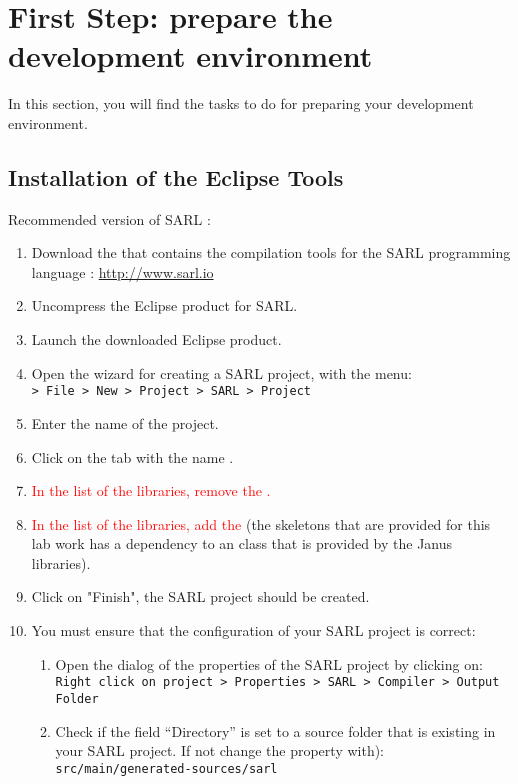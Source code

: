 \section{First Step: prepare the development environment}

In this section, you will find the tasks to do for preparing your development environment.

\subsection{Installation of the Eclipse Tools}

\begin{emphbox}
Recommended version of SARL : \sarlversion
\end{emphbox}

\begin{enumerate}
\item Download the  that contains the compilation tools for the SARL programming language : \url{http://www.sarl.io}
\item Uncompress the Eclipse product for SARL.
\item Launch the downloaded Eclipse product.
\item Open the wizard for creating a SARL project, with the menu: \\
	\texttt{> File > New > Project > SARL > Project}
\item Enter the name of the project.
\item Click on the tab with the name .
\item \textcolor{red}{In the list of the libraries, remove the .}
\item \textcolor{red}{In the list of the libraries, add the } (the skeletons that are provided for this lab work has a dependency to an class that is provided by the Janus libraries).
\item Click on "Finish", the SARL project should be created.
\item You must ensure that the configuration of your SARL project is correct:
	\begin{enumerate}[a]
	\item Open the dialog of the properties of the SARL project by clicking on: \\
		\texttt{Right click on project > Properties > SARL > Compiler > Output Folder}
	\item Check if the field ``Directory'' is set to a source folder that is existing in your SARL project. If not change the property with): \\
		\texttt{src/main/generated-sources/sarl}
	\end{enumerate}
\end{enumerate}

